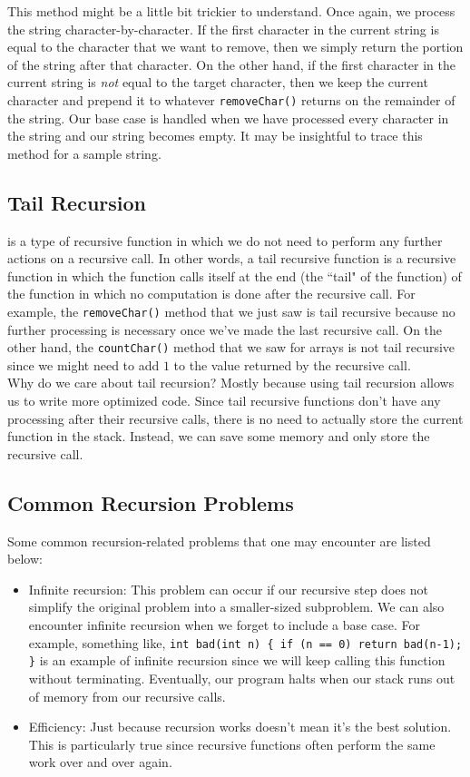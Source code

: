 This method might be a little bit trickier to understand. Once again, we process the string character-by-character. If the first character in the current string is equal to the character that we want to remove, then we simply return the portion of the string after that character. On the other hand, if the first character in the current string is \textit{not} equal to the target character, then we keep the current character and prepend it to whatever \verb!removeChar()! returns on the remainder of the string. Our base case is handled when we have processed every character in the string and our string becomes empty. It may be insightful to trace this method for a sample string. 


\subsection{Tail Recursion}

 is a type of recursive function in which we do not need to perform any further actions on a recursive call. In other words, a tail recursive function is a recursive function in which the function calls itself at the end (the ``tail" of the function) of the function in which no computation is done after the recursive call. For example, the \verb!removeChar()! method that we just saw is tail recursive because no further processing is necessary once we've made the last recursive call. On the other hand, the \verb!countChar()! method that we saw for arrays is not tail recursive since we might need to add $1$ to the value returned by the recursive call. \\ 

\noindent Why do we care about tail recursion? Mostly because using tail recursion allows us to write more optimized code.  Since tail recursive functions don't have any processing after their recursive calls, there is no need to actually store the current function in the stack. Instead, we can save some memory and only store the recursive call. \\


\subsection{Common Recursion Problems}

Some common recursion-related problems that one may encounter are listed below:

\begin{itemize}
    \item Infinite recursion: This problem can occur if our recursive step does not simplify the original problem into a smaller-sized subproblem. We can also encounter infinite recursion when we forget to include a base case. For example, something like, \verb!int bad(int n) { if (n == 0) return bad(n-1); }! is an example of infinite recursion since we will keep calling this function without terminating. Eventually, our program halts when our stack runs out of memory from our recursive calls. 
    \item Efficiency: Just because recursion works doesn't mean it's the best solution. This is particularly true since recursive functions often perform the same work over and over again. 
\end{itemize}